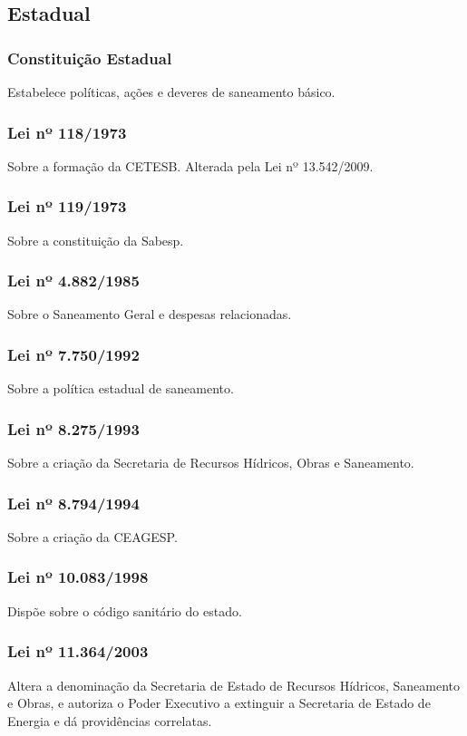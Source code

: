 \begin{subapend}
	\subsection{Estadual}
	\begin{subsubapend}
		\item \subsubsection{Constituição Estadual}
		Estabelece políticas, ações e deveres de saneamento básico.
		\subsubsection{Lei nº 118/1973}
		Sobre a formação da CETESB. Alterada pela Lei nº 13.542/2009.
		\subsubsection{Lei nº 119/1973}
		Sobre a constituição da Sabesp.
		\subsubsection{Lei nº 4.882/1985}
		Sobre o Saneamento Geral e despesas relacionadas.
		\subsubsection{Lei nº 7.750/1992}
		Sobre a política estadual de saneamento.
		\subsubsection{Lei nº 8.275/1993}
		Sobre a criação da Secretaria de Recursos Hídricos, Obras e Saneamento.
		\subsubsection{Lei nº 8.794/1994}
		Sobre a criação da CEAGESP.
		\subsubsection{Lei nº 10.083/1998}
		Dispõe sobre o código sanitário do estado.
		\subsubsection{Lei nº 11.364/2003}
		Altera a denominação da Secretaria de Estado de Recursos Hídricos, Saneamento e Obras, e autoriza o Poder Executivo a extinguir a Secretaria de Estado de Energia e dá providências correlatas.

\end{subsubapend}
\end{subapend}
